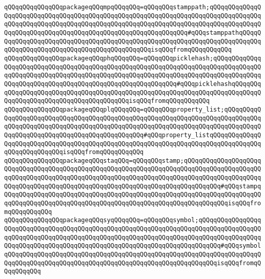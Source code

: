 \verb|qQQqqQQqqQQqqQQqpackageqQQqmpqQQqqQQq=qQQqqQQqstamppath;qQQqqQQqqQQqqQQqqQQqqQQqqQQqqQQqqQQqqQQqqQQqqQQqqQQqqQQqqQQqqQQqqQQqqQQqqQQqqQQqqQQqqQQqqQQqqQQqqQQqqQQqqQQqqQQqqQQqqQQqqQQqqQQqqQQqqQQqqQQqqQQqqQQqqQQqqQQqqQQqqQQqqQQqqQQqqQQqqQQqqQQqqQQqqQQqqQQqqQQqqQQq#qQQqstamppathqQQqqQQqqQQqqQQqqQQqqQQqqQQqqQQqqQQqqQQqqQQqqQQqqQQqqQQqqQQqqQQqqQQqqQQqqQQqqQQqqQQqqQQqqQQqqQQqqQQqqQQqqQQqqQQqqQQqisqQQqfromqQQqqQQqqQQq|\newline
\verb|qQQqqQQqqQQqqQQqpackageqQQqphqQQqqQQq=qQQqqQQqpicklehash;qQQqqQQqqQQqqQQqqQQqqQQqqQQqqQQqqQQqqQQqqQQqqQQqqQQqqQQqqQQqqQQqqQQqqQQqqQQqqQQqqQQqqQQqqQQqqQQqqQQqqQQqqQQqqQQqqQQqqQQqqQQqqQQqqQQqqQQqqQQqqQQqqQQqqQQqqQQqqQQqqQQqqQQqqQQqqQQqqQQqqQQqqQQqqQQqqQQqqQQq#qQQqpicklehashqQQqqQQqqQQqqQQqqQQqqQQqqQQqqQQqqQQqqQQqqQQqqQQqqQQqqQQqqQQqqQQqqQQqqQQqqQQqqQQqqQQqqQQqqQQqqQQqqQQqqQQqqQQqqQQqisqQQqfromqQQqqQQqqQQq|\newline
\verb|qQQqqQQqqQQqqQQqpackageqQQqplqQQqqQQq=qQQqqQQqproperty_list;qQQqqQQqqQQqqQQqqQQqqQQqqQQqqQQqqQQqqQQqqQQqqQQqqQQqqQQqqQQqqQQqqQQqqQQqqQQqqQQqqQQqqQQqqQQqqQQqqQQqqQQqqQQqqQQqqQQqqQQqqQQqqQQqqQQqqQQqqQQqqQQqqQQqqQQqqQQqqQQqqQQqqQQqqQQqqQQqqQQqqQQqqQQq#qQQqproperty_listqQQqqQQqqQQqqQQqqQQqqQQqqQQqqQQqqQQqqQQqqQQqqQQqqQQqqQQqqQQqqQQqqQQqqQQqqQQqqQQqqQQqqQQqqQQqqQQqqQQqisqQQqfromqQQqqQQqqQQq|\newline
\verb|qQQqqQQqqQQqqQQqpackageqQQqstaqQQq=qQQqqQQqstamp;qQQqqQQqqQQqqQQqqQQqqQQqqQQqqQQqqQQqqQQqqQQqqQQqqQQqqQQqqQQqqQQqqQQqqQQqqQQqqQQqqQQqqQQqqQQqqQQqqQQqqQQqqQQqqQQqqQQqqQQqqQQqqQQqqQQqqQQqqQQqqQQqqQQqqQQqqQQqqQQqqQQqqQQqqQQqqQQqqQQqqQQqqQQqqQQqqQQqqQQqqQQqqQQqqQQqqQQqqQQq#qQQqstampqQQqqQQqqQQqqQQqqQQqqQQqqQQqqQQqqQQqqQQqqQQqqQQqqQQqqQQqqQQqqQQqqQQqqQQqqQQqqQQqqQQqqQQqqQQqqQQqqQQqqQQqqQQqqQQqqQQqqQQqqQQqqQQqqQQqisqQQqfromqQQqqQQqqQQq|\newline
\verb|qQQqqQQqqQQqqQQqpackageqQQqsyqQQqqQQq=qQQqqQQqsymbol;qQQqqQQqqQQqqQQqqQQqqQQqqQQqqQQqqQQqqQQqqQQqqQQqqQQqqQQqqQQqqQQqqQQqqQQqqQQqqQQqqQQqqQQqqQQqqQQqqQQqqQQqqQQqqQQqqQQqqQQqqQQqqQQqqQQqqQQqqQQqqQQqqQQqqQQqqQQqqQQqqQQqqQQqqQQqqQQqqQQqqQQqqQQqqQQqqQQqqQQqqQQqqQQqqQQqqQQq#qQQqsymbolqQQqqQQqqQQqqQQqqQQqqQQqqQQqqQQqqQQqqQQqqQQqqQQqqQQqqQQqqQQqqQQqqQQqqQQqqQQqqQQqqQQqqQQqqQQqqQQqqQQqqQQqqQQqqQQqqQQqqQQqqQQqqQQqisqQQqfromqQQqqQQqqQQq|\newline
